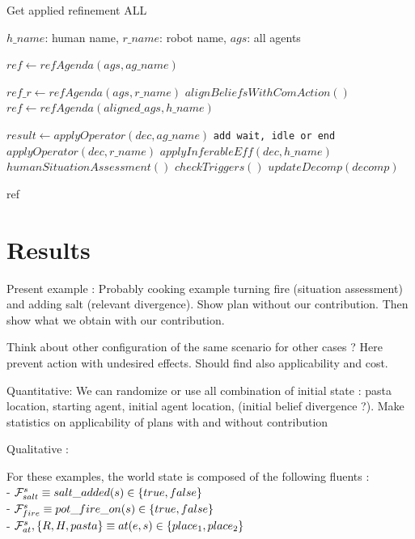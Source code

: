 \documentclass[letterpaper]{article} %
\begin{document}
\begin{algorithm}
\caption{Get applied refinement ALL}\label{alg:ap_ref_all}
\begin{algorithmic}
\Require $h\_name$: human name, $r\_name$: robot name, $ags$: all agents

\State $ref \gets refAgenda(ags, ag\_name)$

\State $ref\_r \gets refAgenda(ags, r\_name)$ 
 
    \State $alignBeliefsWithComAction()$
    \State $ref \gets refAgenda(aligned\_ags, h\_name)$
\EndIf


    \State $result \gets applyOperator(dec, ag\_name)$ 
        \State \texttt{add wait, idle or end}
    \Else
        \State $applyOperator(dec, r\_name)$ 
        \State $applyInferableEff(dec, h\_name)$ 
        \State $humanSituationAssessment()$
        \State $checkTriggers()$
        \State $updateDecomp(decomp)$
    \EndIf
\EndFor

\State \Return ref

\end{algorithmic}
\end{algorithm}



\section{Results}

Present example : Probably cooking example turning fire (situation assessment) and adding salt (relevant divergence). Show plan without our contribution. Then show what we obtain with our contribution.



Think about other configuration of the same scenario for other cases ? Here prevent action with undesired effects. Should find also applicability and cost.

Quantitative: We can randomize or use all combination of initial state : pasta location, starting agent, initial agent location, (initial belief divergence ?). Make statistics on applicability of plans with and without contribution 

Qualitative :

For these examples, the world state is composed of the following fluents :\\
- $\mathcal{F}^{s}_{salt}{} \equiv salt\_added(s)\in\{true, false\}$\\
- $\mathcal{F}^{s}_{fire}{} \equiv pot\_fire\_on(s)\in\{true, false\}$\\
- $\mathcal{F}^{s}_{at}{, \{R,H,pasta\} } \equiv at(e, s)\in \{place_1, place_2\}$
\end{document}
